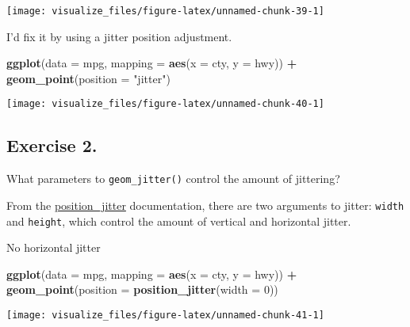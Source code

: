 \documentclass[]{book}
\newenvironment{Shaded}{\begin{snugshade}}{\end{snugshade}}
\newcommand{\DataTypeTok}[1]{\textcolor[rgb]{0.13,0.29,0.53}{#1}}
\newcommand{\DecValTok}[1]{\textcolor[rgb]{0.00,0.00,0.81}{#1}}
\newcommand{\KeywordTok}[1]{\textcolor[rgb]{0.13,0.29,0.53}{\textbf{#1}}}
\newcommand{\NormalTok}[1]{#1}
\newcommand{\OperatorTok}[1]{\textcolor[rgb]{0.81,0.36,0.00}{\textbf{#1}}}
\newcommand{\StringTok}[1]{\textcolor[rgb]{0.31,0.60,0.02}{#1}}
\theoremstyle{definition}
\theoremstyle{definition}
\theoremstyle{definition}
\theoremstyle{remark}
\begin{document}
\begin{center}\texttt{[image: visualize\_files/figure-latex/unnamed-chunk-39-1]} \end{center}

I'd fix it by using a jitter position adjustment.

\begin{Shaded}
\begin{Highlighting}[]
\KeywordTok{ggplot}\NormalTok{(}\DataTypeTok{data =}\NormalTok{ mpg, }\DataTypeTok{mapping =} \KeywordTok{aes}\NormalTok{(}\DataTypeTok{x =}\NormalTok{ cty, }\DataTypeTok{y =}\NormalTok{ hwy)) }\OperatorTok{+}\StringTok{ }
\StringTok{  }\KeywordTok{geom_point}\NormalTok{(}\DataTypeTok{position =} \StringTok{"jitter"}\NormalTok{)}
\end{Highlighting}
\end{Shaded}

\begin{center}\texttt{[image: visualize\_files/figure-latex/unnamed-chunk-40-1]} \end{center}

\hypertarget{exercise-2.-5}{%
\subsection{Exercise 2.}\label{exercise-2.-5}}

What parameters to \texttt{geom\_jitter()} control the amount of
jittering?

From the
\href{http://docs.ggplot2.org/current/position_jitter.html}{position\_jitter}
documentation, there are two arguments to jitter: \texttt{width} and
\texttt{height}, which control the amount of vertical and horizontal
jitter.

No horizontal jitter

\begin{Shaded}
\begin{Highlighting}[]
\KeywordTok{ggplot}\NormalTok{(}\DataTypeTok{data =}\NormalTok{ mpg, }\DataTypeTok{mapping =} \KeywordTok{aes}\NormalTok{(}\DataTypeTok{x =}\NormalTok{ cty, }\DataTypeTok{y =}\NormalTok{ hwy)) }\OperatorTok{+}\StringTok{ }
\StringTok{  }\KeywordTok{geom_point}\NormalTok{(}\DataTypeTok{position =} \KeywordTok{position_jitter}\NormalTok{(}\DataTypeTok{width =} \DecValTok{0}\NormalTok{))}
\end{Highlighting}
\end{Shaded}

\begin{center}\texttt{[image: visualize\_files/figure-latex/unnamed-chunk-41-1]} \end{center}
\end{document}
